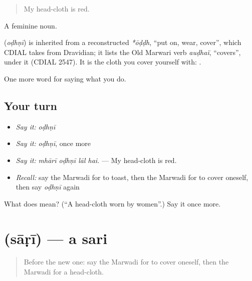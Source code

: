\begin{quote}
My head-cloth is red.
\end{quote}

A feminine noun.

\begin{cousinweb}
\textbf{} (\emph{oḍhṇī}) is inherited from a reconstructed \emph{*ōḍḍh}, \textquotedblleft{}put on, wear, cover\textquotedblright{}, which CDIAL takes from Dravidian; it lists the Old Marwari verb \emph{auḍhaï}, \textquotedblleft{}covers\textquotedblright{}, under it (CDIAL 2547). It is the cloth you cover yourself with: \textbf{}.
\end{cousinweb}

\begin{grammarlens}[title={What you've built}]
One more word for saying what you do.
\end{grammarlens}

\subsection*{Your turn}
\begin{itemize}
\raggedright
  \item \emph{Say it:} \emph{oḍhṇī}
  \item \emph{Say it:} \emph{oḍhṇī}, once more
  \item \emph{Say it:} \emph{mhārī oḍhṇī lāl hai.} — My head-cloth is red.
  \item \emph{Recall:} say the Marwadi for to toast, then the Marwadi for to cover oneself, then say \emph{oḍhṇī} again
\end{itemize}

\begin{tcolorbox}[breakable,colback=teal!4,colframe=teal!35!black,title={Before you move on}]
What does  mean? (\textquotedblleft{}A head-cloth worn by women\textquotedblright{}.) Say it once more.
\end{tcolorbox}
\section[\texorpdfstring{\mw{साड़ी} (sāṛī)}{साड़ी (sāṛī)}]{ (sāṛī) — a sari}

\label{lesson:MW-C174-sari}



\begin{quote}
Before the new one: say the Marwadi for to cover oneself, then the Marwadi for a head-cloth.
\end{quote}

